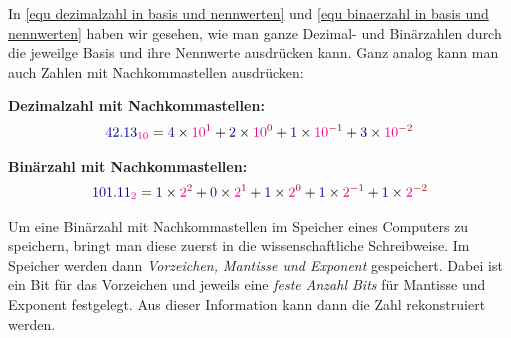 In \eqref{equ dezimalzahl in basis und nennwerten} und \eqref{equ binaerzahl in basis und nennwerten} haben wir gesehen, wie man ganze Dezimal- und Binärzahlen durch die jeweilge Basis und ihre Nennwerte ausdrücken kann. Ganz analog kann man auch Zahlen mit Nachkommastellen ausdrücken:

\textbf{Dezimalzahl mit Nachkommastellen:}
\begin{align}
	\textcolor{blue}{42.13}_{\textcolor{magenta}{10}}
	= \textcolor{blue}{4}\times \textcolor{magenta}{10}^{\textcolor{red}{1}} 
	+ \textcolor{blue}{2}\times \textcolor{magenta}{10}^{\textcolor{red}{0}} 
	+ \textcolor{blue}{1}\times \textcolor{magenta}{10}^{\textcolor{red}{-1}} 
	+ \textcolor{blue}{3}\times \textcolor{magenta}{10}^{\textcolor{red}{-2}}
\end{align}

\textbf{Binärzahl mit Nachkommastellen:}
\begin{align}
	\textcolor{blue}{101.11}_{\textcolor{magenta}{2}}
	= \textcolor{blue}{1}\times \textcolor{magenta}{2}^{\textcolor{red}{2}} 
	+ \textcolor{blue}{0}\times \textcolor{magenta}{2}^{\textcolor{red}{1}} 
	+ \textcolor{blue}{1}\times \textcolor{magenta}{2}^{\textcolor{red}{0}} 
	+ \textcolor{blue}{1}\times \textcolor{magenta}{2}^{\textcolor{red}{-1}} 
	+ \textcolor{blue}{1}\times \textcolor{magenta}{2}^{\textcolor{red}{-2}}
\end{align}

Um eine Binärzahl mit Nachkommastellen im Speicher eines Computers zu speichern, bringt man diese zuerst in die wissenschaftliche Schreibweise. Im Speicher werden dann \textit{Vorzeichen, Mantisse und Exponent} gespeichert. 
Dabei ist ein Bit für das Vorzeichen und jeweils eine \textit{feste Anzahl Bits} für Mantisse und Exponent festgelegt.
Aus dieser Information kann dann die Zahl rekonstruiert werden.


